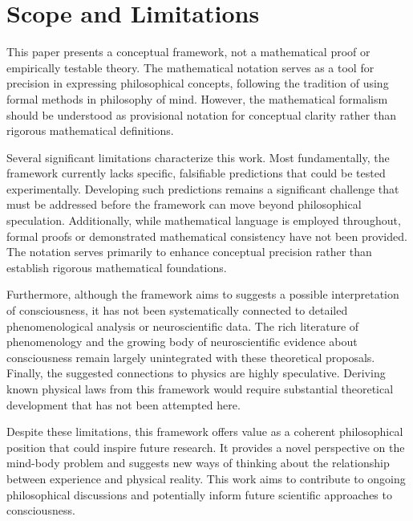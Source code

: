 \section{Scope and Limitations}

This paper presents a conceptual framework, not a mathematical proof or empirically testable theory. The mathematical notation serves as a tool for precision in expressing philosophical concepts, following the tradition of using formal methods in philosophy of mind. However, the mathematical formalism should be understood as provisional notation for conceptual clarity rather than rigorous mathematical definitions.

Several significant limitations characterize this work. Most fundamentally, the framework currently lacks specific, falsifiable predictions that could be tested experimentally. Developing such predictions remains a significant challenge that must be addressed before the framework can move beyond philosophical speculation. Additionally, while mathematical language is employed throughout, formal proofs or demonstrated mathematical consistency have not been provided. The notation serves primarily to enhance conceptual precision rather than establish rigorous mathematical foundations.

Furthermore, although the framework aims to suggests a possible interpretation of consciousness, it has not been systematically connected to detailed phenomenological analysis or neuroscientific data. The rich literature of phenomenology and the growing body of neuroscientific evidence about consciousness remain largely unintegrated with these theoretical proposals. Finally, the suggested connections to physics are highly speculative. Deriving known physical laws from this framework would require substantial theoretical development that has not been attempted here.

Despite these limitations, this framework offers value as a coherent philosophical position that could inspire future research. It provides a novel perspective on the mind-body problem and suggests new ways of thinking about the relationship between experience and physical reality. This work aims to contribute to ongoing philosophical discussions and potentially inform future scientific approaches to consciousness.
